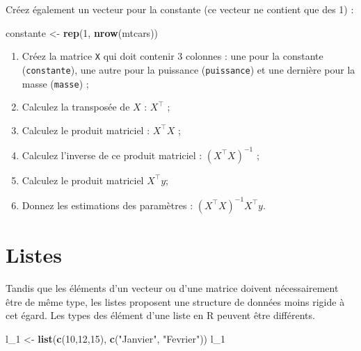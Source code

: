 \documentclass[
  11pt,
]{book}
\newenvironment{Shaded}{\begin{snugshade}}{\end{snugshade}}
\newcommand{\DecValTok}[1]{\textcolor[rgb]{0.00,0.00,0.81}{#1}}
\newcommand{\FunctionTok}[1]{\textcolor[rgb]{0.13,0.29,0.53}{\textbf{#1}}}
\newcommand{\NormalTok}[1]{#1}
\newcommand{\OtherTok}[1]{\textcolor[rgb]{0.56,0.35,0.01}{#1}}
\newcommand{\StringTok}[1]{\textcolor[rgb]{0.31,0.60,0.02}{#1}}
\providecommand{\tightlist}{%
  \setlength{\itemsep}{0pt}\setlength{\parskip}{0pt}}
\numberwithin{equation}{section}
\numberwithin{countremarque}{section}
\newenvironment{greenbox}{
  \begin{tcolorbox}[breakable, colback=vert,coltext=black,
                  colframe=grisfonce]}
 {\end{tcolorbox}}
\begin{document}
\begin{greenbox}
Créez également un vecteur pour la constante (ce vecteur ne contient que des 1) :

\begin{Shaded}
\begin{Highlighting}[]
\NormalTok{constante }\OtherTok{\textless{}{-}} \FunctionTok{rep}\NormalTok{(}\DecValTok{1}\NormalTok{, }\FunctionTok{nrow}\NormalTok{(mtcars))}
\end{Highlighting}
\end{Shaded}

\begin{enumerate}
\def\labelenumi{\arabic{enumi}.}
\tightlist
\item
  Créez la matrice \texttt{X} qui doit contenir 3 colonnes : une pour la constante (\texttt{constante}), une autre pour la puissance (\texttt{puissance}) et une dernière pour la masse (\texttt{masse}) ;
\item
  Calculez la transposée de \(X\) : \(X^\top\) ;
\item
  Calculez le produit matriciel : \(X^\top X\) ;
\item
  Calculez l'inverse de ce produit matriciel : \((X^\top X)^{-1}\) ;
\item
  Calculez le produit matriciel \(X^\top y\);
\item
  Donnez les estimations des paramètres : \((X^\top X)^{-1} X^\top y\).
\end{enumerate}

\end{greenbox}

\hypertarget{listes}{%
\section{Listes}\label{listes}}

Tandis que les éléments d'un vecteur ou d'une matrice doivent nécessairement être de même type, les listes proposent une structure de données moins rigide à cet égard. Les types des élément d'une liste en R peuvent être différents.

\begin{Shaded}
\begin{Highlighting}[]
\NormalTok{l\_1 }\OtherTok{\textless{}{-}} \FunctionTok{list}\NormalTok{(}\FunctionTok{c}\NormalTok{(}\DecValTok{10}\NormalTok{,}\DecValTok{12}\NormalTok{,}\DecValTok{15}\NormalTok{), }\FunctionTok{c}\NormalTok{(}\StringTok{"Janvier"}\NormalTok{, }\StringTok{"Fevrier"}\NormalTok{))}
\NormalTok{l\_1}
\end{Highlighting}
\end{Shaded}
\end{document}
